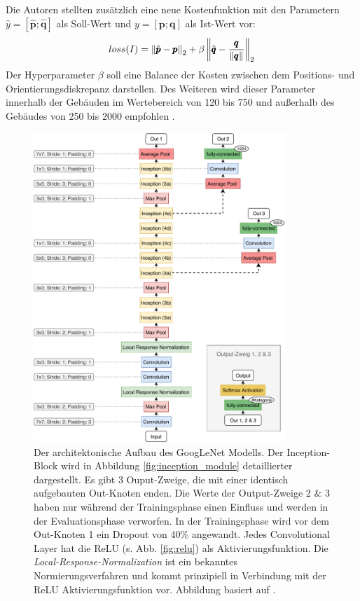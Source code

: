 Die Autoren \citet{kendallPoseNetConvolutionalNetwork2015} stellten zusätzlich eine neue Kostenfunktion mit den Parametern $\hat{y} = [\hat{\pmb{p}};\hat{\pmb{q}}]$ als Soll-Wert und $y = [\pmb{p};\pmb{q}]$ als Ist-Wert vor:
\begin{equation}
	\label{eq:posenet_loss}
	loss(I) = \left\lVert \hat{\pmb{p}} - \pmb{p} \right\rVert_2 + \beta \left\lVert \hat{\pmb{q}} - \frac{\pmb{q}}{\left\lVert\pmb{q}\right\rVert}\right\rVert_2
\end{equation}
Der Hyperparameter $\beta$ soll eine Balance der Kosten zwischen dem Positions- und Orientierungsdiskrepanz darstellen. Des Weiteren wird dieser Parameter innerhalb der Gebäuden im Wertebereich von 120 bis 750 und außerhalb des Gebäudes von 250 bis 2000 empfohlen \cite{kendallPoseNetConvolutionalNetwork2015}. 

\begin{figure}[bp]
	\centering
	\includegraphics[width=0.85\textwidth]{images/googlenet/googlenet_diagram.pdf}
	\caption{Der architektonische Aufbau des GoogLeNet Modells. Der Inception-Block wird in Abbildung \ref{fig:inception_module} detaillierter dargestellt. Es gibt 3 Ouput-Zweige, die mit einer identisch aufgebauten Out-Knoten enden. Die Werte der Output-Zweige 2 \& 3 haben nur während der Trainingsphase einen Einfluss und werden in der Evaluationsphase verworfen. In der Trainingsphase wird vor dem Out-Knoten 1 ein Dropout von 40\% angewandt. Jedes Convolutional Layer hat die ReLU (s. Abb. \ref{fig:relu}) als Aktivierungsfunktion. Die \textit{Local-Response-Normalization} \cite{krizhevskyImageNetClassificationDeep2012} ist ein bekanntes Normierungsverfahren und kommt prinzipiell in Verbindung mit der ReLU Aktivierungsfunktion vor. Abbildung basiert auf \cite{szegedyGoingDeeperConvolutions2015}.}
	\label{fig:googlenet}
\end{figure}

